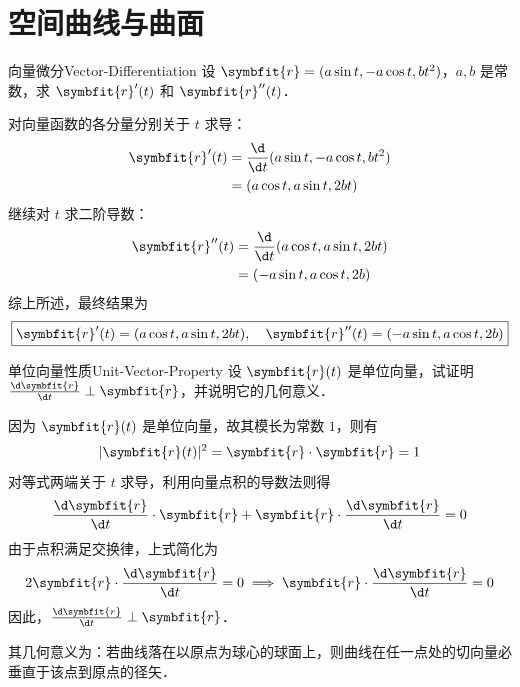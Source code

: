 \section{空间曲线与曲面}

\begin{problem}{向量微分}{Vector-Differentiation}
    设 $\symbfit{r} = (a \sin t, -a \cos t, b t^2)$，$a, b$ 是常数，求 $\symbfit{r}'(t)$ 和 $\symbfit{r}''(t)$．
\end{problem}

\begin{solution}
    对向量函数的各分量分别关于 $t$ 求导：
    \begin{equation}
        \begin{aligned}
            \symbfit{r}'(t) & = \frac{\d}{\d t} (a \sin t, -a \cos t, b t^2) \\
                            & = (a \cos t, a \sin t, 2bt)
        \end{aligned}
    \end{equation}
    继续对 $t$ 求二阶导数：
    \begin{equation}
        \begin{aligned}
            \symbfit{r}''(t) & = \frac{\d}{\d t} (a \cos t, a \sin t, 2bt) \\
                             & = (-a \sin t, a \cos t, 2b)
        \end{aligned}
    \end{equation}
    综上所述，最终结果为
    \begin{equation}
        \boxed{\symbfit{r}'(t) = (a \cos t, a \sin t, 2bt), \quad \symbfit{r}''(t) = (-a \sin t, a \cos t, 2b)}
    \end{equation}
\end{solution}


\begin{problem}{单位向量性质}{Unit-Vector-Property}
    设 $\symbfit{r}(t)$ 是单位向量，试证明 $\frac{\d \symbfit{r}}{\d t} \perp \symbfit{r}$，并说明它的几何意义．
\end{problem}

\begin{myproof}
    因为 $\symbfit{r}(t)$ 是单位向量，故其模长为常数 $1$，则有
    \begin{equation}
        |\symbfit{r}(t)|^2 = \symbfit{r} \cdot \symbfit{r} = 1
    \end{equation}
    对等式两端关于 $t$ 求导，利用向量点积的导数法则得
    \begin{equation}
        \frac{\d \symbfit{r}}{\d t} \cdot \symbfit{r} + \symbfit{r} \cdot \frac{\d \symbfit{r}}{\d t} = 0
    \end{equation}
    由于点积满足交换律，上式简化为
    \begin{equation}
        2 \symbfit{r} \cdot \frac{\d \symbfit{r}}{\d t} = 0 \implies \symbfit{r} \cdot \frac{\d \symbfit{r}}{\d t} = 0
    \end{equation}
    因此，$\frac{\d \symbfit{r}}{\d t} \perp \symbfit{r}$．

    其几何意义为：若曲线落在以原点为球心的球面上，则曲线在任一点处的切向量必垂直于该点到原点的径矢．
\end{myproof}


